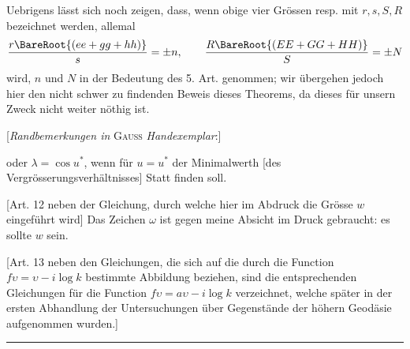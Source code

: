 \par\indent{}%
Uebrigens lässt sich noch zeigen, dass, wenn obige vier Grössen resp. mit \(r,s,S,R\) bezeichnet werden, allemal
\[
\frac{r\BareRoot{(ee+gg+hh)}}{s}=\pm n,\qquad\frac{R\BareRoot{(EE+GG+HH)}}{S}=\pm N
\]
\noindent wird, \(n\) und \(N\) in der Bedeutung des 5. Art. genommen; wir übergehen jedoch hier den nicht schwer zu findenden Beweis dieses Theorems, da dieses für unsern Zweck nicht weiter nöthig ist.

\par\bigskip{}
\begin{center}[\textit{Randbemerkungen in} \textsc{Gauss} \textit{Handexemplar}:]\end{center}
\begingroup\small
\par{} oder \(\lambda=\cos u^*\), wenn für \(u=u^*\) der Minimalwerth [des Vergrösserungsverhältnisses] Statt finden soll.

[Art. 12 neben der Gleichung, durch welche hier im Abdruck die Grösse \(w\) eingeführt wird] Das Zeichen \(\omega\) ist gegen meine Absicht im Druck gebraucht: es sollte \(w\) sein.

[Art. 13 neben den Gleichungen, die sich auf die durch die Function \(f\upsilon=\upsilon-i\log k\) bestimmte Abbildung beziehen, sind die entsprechenden Gleichungen für die Function \(f\upsilon=a\upsilon-i\log k\) verzeichnet, welche später in der ersten Abhandlung der Untersuchungen über Gegenstände der höhern Geodäsie aufgenommen wurden.]
\par\endgroup
\begin{center}\rule{1.2in}{.3pt}\end{center}
